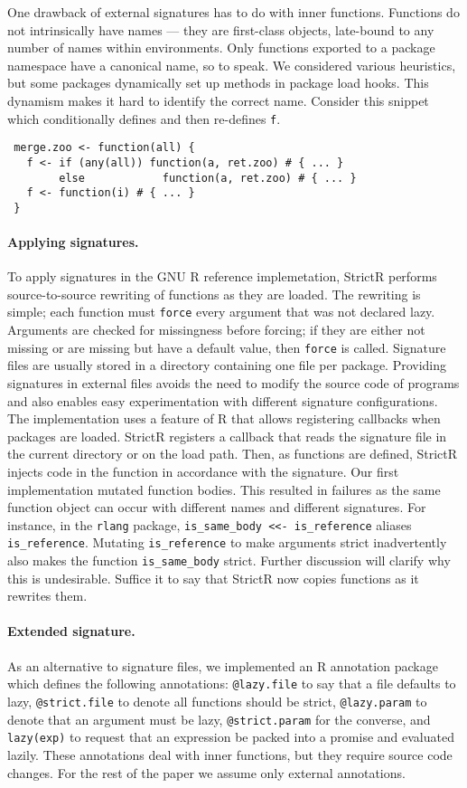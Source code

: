 \documentclass[review,nonacm,screen,acmsmall,anonymous=true]{acmart}
\newcommand{\code}[1]{\lstinline |#1|\xspace}
\renewcommand{\c}[1]{\lstinline |#1|\xspace}
\newcommand{\strictr}{{\sf StrictR}\xspace}
\begin{document}
One drawback of external signatures has to do with inner functions. Functions do
not intrinsically have names --- they are first-class objects, late-bound to any
number of names within environments. Only functions exported to a package
namespace have a canonical name, so to speak. We considered various heuristics,
but some packages dynamically set up methods in package load hooks. This dynamism
makes it hard to identify the correct name. Consider this snippet
which conditionally defines and then re-defines \c f.

\begin{lstlisting}
 merge.zoo <- function(all) {
   f <- if (any(all)) function(a, ret.zoo) # { ... }
        else            function(a, ret.zoo) # { ... }
   f <- function(i) # { ... }
 }
\end{lstlisting}

\paragraph{Applying signatures.}
To apply signatures in the GNU R reference implemetation, \strictr performs
source-to-source rewriting of functions as they are loaded. The rewriting is
simple; each function must \c{force} every argument that was not declared lazy.
Arguments are checked for missingness before forcing; if they are either not
missing or are missing but have a default value, then \c{force} is called.
Signature files are usually stored in a directory containing one file per
package. Providing signatures in external files avoids the need to modify the
source code of programs and also enables easy experimentation with different
signature configurations. The implementation uses a feature of R that allows
registering callbacks when packages are loaded. \strictr registers a callback
that reads the signature file in the current directory or on the load path.
Then, as functions are defined, \strictr injects code in the function in
accordance with the signature. Our first implementation mutated function bodies.
This resulted in failures as the same function object can occur with different
names and different signatures. For instance, in the \code{rlang} package,
\code{is_same_body <<- is_reference} aliases \code{is_reference}. Mutating
\code{is_reference} to make arguments strict inadvertently also makes the
function \code{is_same_body} strict. Further discussion will clarify why this is
undesirable. Suffice it to say that \strictr now copies functions as it rewrites
them.

\paragraph{Extended signature.}
As an alternative to signature files, we implemented an R annotation package
which defines the following annotations: \c{@lazy.file} to say that a
file defaults to lazy, \c{@strict.file} to denote all functions should be
strict, \c{@lazy.param} to denote that an argument must be lazy,
\c{@strict.param} for the converse, and \c{lazy(exp)} to request that an
expression be packed into a promise and evaluated lazily. These annotations deal
with inner functions, but they require source code changes. For the rest of the
paper we assume only external annotations.
\end{document}
